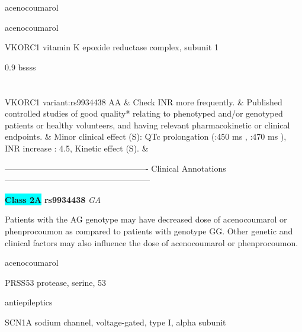 \documentclass{resume} %
\begin{document}
\begin{rSection}{ acenocoumarol }
\begin{rSection}{ acenocoumarol }
\begin{rSubsection}{ VKORC1 }{ vitamin K epoxide reductase complex, subunit 1 }{}{}
\begin{center}
\begin{tabularx}{0.9\textwidth}{ bssss }
		\vspace{1pt}\\
		\hline \\
		\vspace{1pt}\\
		         VKORC1 variant:rs9934438 AA & Check INR more frequently. & Published controlled studies of good quality* relating to phenotyped and/or genotyped patients or healthy volunteers, and having relevant pharmacokinetic or clinical endpoints. & Minor clinical effect (S): QTc prolongation (:450 ms , :470 ms ),  INR increase : 4.5,  Kinetic effect (S). &
\\
		\end{tabularx}
		\end{center}
		\normalsize
		\vspace{10pt}
		        
\item[] ---------------------------------------------------- Clinical Annotations -----------------------------------------------------\newline
\item \textbf{\colorbox{cyan} {Class 2A}} \textbf{ rs9934438 } \textit{ GA }
\item[] Patients with the AG genotype may have decreased dose of acenocoumarol or phenprocoumon as compared to patients with genotype GG. Other genetic and clinical factors may also influence the dose of acenocoumarol or phenprocoumon.

\end{rSubsection}\begin{rSection}{ acenocoumarol }
\item[]
\begin{rSubsection}{ PRSS53 }{ protease, serine, 53 }{}{}
\item[]


\end{rSubsection}

\end{rSection}\begin{rSection}{ antiepileptics }
\item[]
\begin{rSubsection}{ SCN1A }{ sodium channel, voltage-gated, type I, alpha subunit }{}{}
\item[]


\end{rSubsection}


\end{rSection}
\end{rSection}
\end{rSection}
\end{document}
